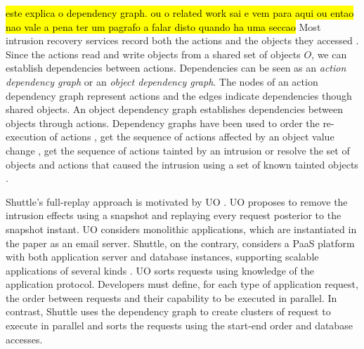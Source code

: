 {{\hl{este explica o dependency graph. ou o related work sai e vem para aqui ou entao nao vale a pena ter um pagrafo a falar disto quando ha uma seccao} %
Most intrusion recovery services record both the actions and  the objects they accessed  \cite{Akkus2010,itdb,warp}. Since the actions read and write objects from a shared set of objects $O$, we can establish dependencies between actions. Dependencies can be seen as an \textit{action dependency graph} or an \textit{object dependency graph}. The nodes of an action dependency graph represent actions and the edges indicate dependencies though shared objects. An object dependency graph establishes dependencies between objects through actions. Dependency graphs have been used to order the re-execution of actions \cite{undoForOperators}, get the sequence of actions affected by an object value change \cite{warp}, get the sequence of actions tainted by an intrusion \cite{Akkus2010} or resolve the set of objects and actions that caused the intrusion using a set of known tainted objects \cite{backtracker}. 



}


Shuttle's full-replay approach is motivated by UO \cite{undoForOperators}. UO proposes to remove the intrusion effects using a snapshot and replaying every request posterior to the snapshot instant.  UO considers monolithic applications, which are instantiated in the paper as an email server. Shuttle, on the contrary, considers a \ac{PaaS} platform with both application server and database instances, supporting scalable applications of several kinds . UO sorts requests using knowledge of the application protocol. Developers must define, for each type of application request, the order between requests and their capability to be executed in parallel. In contrast, Shuttle uses the dependency graph to create clusters of request to execute in parallel and sorts the requests using the start-end order and database accesses.


}
